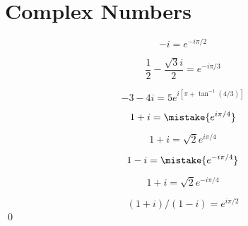 \documentclass[12pt]{article}
\begin{document}



\pagebreak
\section*{Complex Numbers}




\begin{equation}
    -i = e^{-i \pi/2}
\end{equation}


\begin{equation}
    \frac{1}{2} - \frac{\sqrt{3}i}{2} = e^{-i \pi/3}
\end{equation}


\begin{equation}
    -3 - 4i = 5 e^{i[\pi + \tan^{-1}(4/3)]}
\end{equation}


\begin{equation}
    1 + i = \mistake{e^{i \pi/4}}
\end{equation}

\begin{correction}
    \begin{equation*}
        1 + i = \sqrt{2} e^{i \pi/4}
    \end{equation*}
\end{correction}


\begin{equation}
    1 - i = \mistake{e^{-i \pi/4}}
\end{equation}

\begin{correction}
    \begin{equation*}
        1 + i = \sqrt{2} e^{-i \pi/4}
    \end{equation*}
\end{correction}


\begin{equation}
    (1 + i)/(1 - i) = e^{i \pi/2}
\end{equation}
\qed



\end{document}
